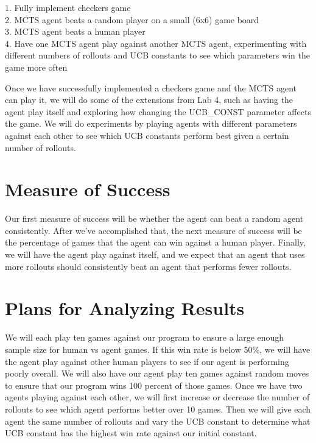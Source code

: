 \documentclass[11pt]{article}
\begin{document}
1. Fully implement checkers game\\
2. MCTS agent beats a random player on a small (6x6) game board\\
3. MCTS agent beats a human player \\
4. Have one MCTS agent play against another MCTS agent, experimenting with different numbers of rollouts and UCB constants to see which parameters win the game more often


Once we have successfully implemented a checkers game and the MCTS agent can play it, we will do some of the extensions from Lab 4, such as having the agent play itself and exploring how changing the UCB\_CONST parameter affects the game. We will do experiments by playing agents with different parameters against each other to see which UCB constants perform best given a certain number of rollouts. 

\section{Measure of Success}


Our first measure of success will be whether the agent can beat a random agent consistently. After we've accomplished that, the next measure of success will be the percentage of games that the agent can win against a human player. Finally, we will have the agent play against itself, and we expect that an agent that uses more rollouts should consistently beat an agent that performs fewer rollouts. 

\section{Plans for Analyzing Results}


We will each play ten games against our program to ensure a large enough sample size for human vs agent games. If this win rate is below 50\%, we will have the agent play against other human players to see if our agent is performing poorly overall. We will also have our agent play ten games against random moves to ensure that our program wins 100 percent of those games. Once we have two agents playing against each other, we will first increase or decrease the number of rollouts to see which agent performs better over 10 games. Then we will give each agent the same number of rollouts and vary the UCB constant to determine what UCB constant has the highest win rate against our initial constant. 
\end{document}
